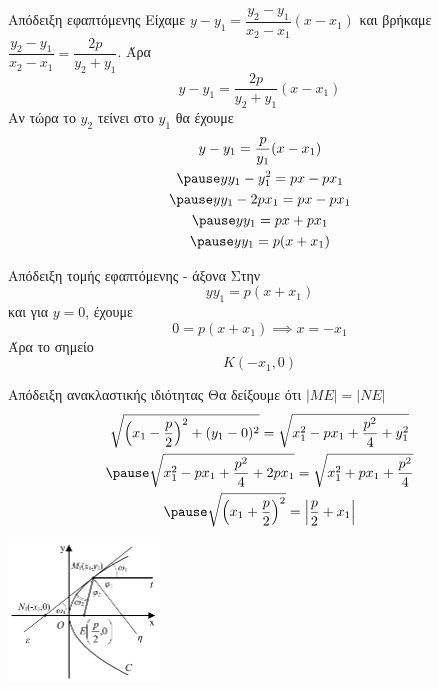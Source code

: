 \documentclass[greek]{beamer}
\begin{document}
\begin{frame}{Απόδειξη εφαπτόμενης}
  Είχαμε $y-y_1=\dfrac{y_2-y_1}{x_2-x_1}(x-x_1)$
  και βρήκαμε $\dfrac{y_2-y_1}{x_2-x_1}=\dfrac{2p}{y_2+y_1}$.
  Άρα
  $$y-y_1=\dfrac{2p}{y_2+y_1}(x-x_1)$$
  Αν τώρα το $y_2$ τείνει στο $y_1$ θα έχουμε
  \begin{gather*}
    y-y_1=\dfrac{p}{y_1}(x-x_1) \\ \pause
    yy_1-y_1^2=px-px_1 \\ \pause
    yy_1-2px_1=px-px_1 \\ \pause
    yy_1=px+px_1 \\ \pause
    yy_1=p(x+x_1)
  \end{gather*}

  \hyperlink{Εφαπτόμενη}{}
\end{frame}

\begin{frame}[label=Απόδειξη1]{Απόδειξη τομής εφαπτόμενης - άξονα}
  Στην
  $$yy_1=p(x+x_1)$$
  και για $y=0$, έχουμε
  $$0=p(x+x_1)\implies x=-x_1$$
  Άρα το σημείο $$Κ(-x_1,0)$$
  \hyperlink{Ιδιότητες}{}
\end{frame}

\begin{frame}[label=Απόδειξη2]{Απόδειξη ανακλαστικής ιδιότητας}
  Θα δείξουμε ότι $|ΜΕ|=|ΝΕ|$
  \begin{gather*}
    \sqrt{\left( x_1-\frac{p}{2} \right)^2+(y_1-0)^2 }=\sqrt{x_1^2-px_1+\frac{p^2}{4}+y_1^2 } \\ \pause
    \sqrt{x_1^2-px_1+\frac{p^2}{4}+2px_1 }=\sqrt{x_1^2+px_1+\frac{p^2}{4} } \\ \pause
    \sqrt{\left( x_1+\frac{p}{2} \right)^2}=\left| \frac{p}{2}+x_1 \right|
  \end{gather*}

  \centering
  \includegraphics[width=0.3\textwidth]{"../images/reflection.png"}

  \hyperlink{Ιδιότητες}{}
\end{frame}
\end{document}
